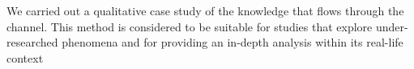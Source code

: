 \documentclass{sig-alternate-05-2015}
\begin{document}
    We carried out a qualitative case study of the knowledge that flows through the channel. 
    This method is considered to be suitable for studies that explore under-researched phenomena and for providing an in-depth analysis within its real-life context~\cite{Yin2009}







\end{document}
